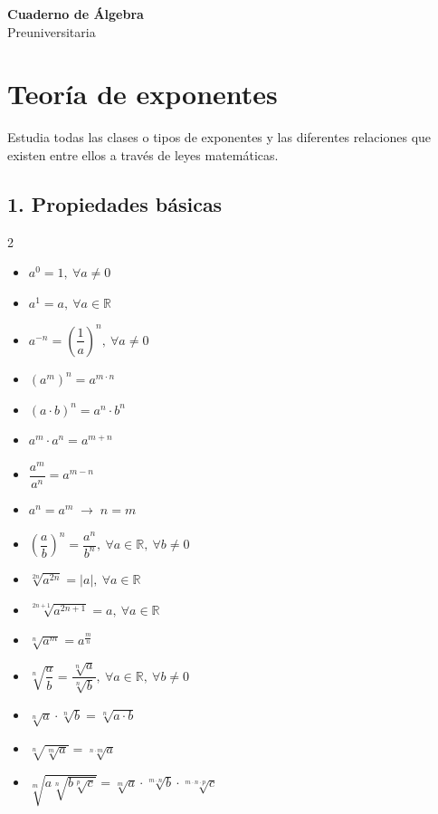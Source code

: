 \documentclass[11pt,a4paper]{article}
\begin{document}
\begin{center}
{\Huge\bfseries\color{rojo} Cuaderno de Álgebra}\\[6pt]
{\Large\color{azul} Preuniversitaria}
\end{center}

\tableofcontents
\newpage
\section{Teoría de exponentes}

Estudia todas las clases o tipos de exponentes y las diferentes relaciones que
existen entre ellos a través de leyes matemáticas.

\subsection*{1. Propiedades básicas}

\begin{multicols}{2}
\begin{itemize}[label=$\ast$]
  \item $a^0 = 1,\ \forall a \neq 0$
  \item $a^1 = a,\ \forall a \in \mathbb{R}$
  \item $a^{-n} = \left(\dfrac{1}{a}\right)^{n},\ \forall a \neq 0$
  \item $(a^m)^n = a^{m\cdot n}$
  \item $(a\cdot b)^n = a^n\cdot b^n$
  \item $a^m\cdot a^n = a^{m+n}$
  \item $\dfrac{a^m}{a^n} = a^{m-n}$
  \item $a^n = a^m \;\rightarrow\; n = m$
  \item $\left(\dfrac{a}{b}\right)^{n} = \dfrac{a^n}{b^n},\ \forall a\in\mathbb{R},\ \forall b\neq 0$
  \item $\sqrt[2n]{a^{2n}} = |a|,\ \forall a \in \mathbb{R}$
  \item $\sqrt[2n+1]{a^{2n+1}} = a,\ \forall a \in \mathbb{R}$
  \item $\sqrt[n]{a^m} = a^{\frac{m}{n}}$
  \item $\sqrt[n]{\dfrac{a}{b}} = \dfrac{\sqrt[n]{a}}{\sqrt[n]{b}},\ \forall a\in\mathbb{R},\ \forall b\neq 0$
  \item $\sqrt[n]{a}\cdot\sqrt[n]{b} = \sqrt[n]{a\cdot b}$
  \item $\sqrt[n]{\sqrt[m]{a}} = \sqrt[n\cdot m]{a}$
  \item $\sqrt[m]{a\sqrt[n]{b\sqrt[p]{c}}} = \sqrt[m]{a}\cdot\sqrt[m\cdot n]{b}\cdot\sqrt[m\cdot n\cdot p]{c}$
\end{itemize}
\end{multicols}
\end{document}
